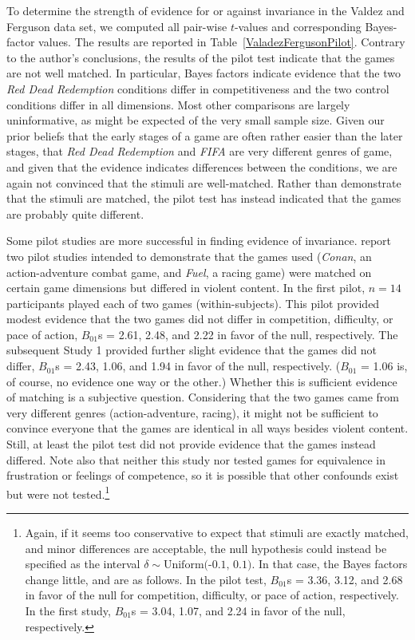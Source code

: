 \documentclass[man]{apa6}
\begin{document}
To determine the strength of evidence for or against invariance in the Valdez and Ferguson data set, we computed all pair-wise $t$-values and corresponding Bayes-factor values.  The results are reported in Table~\ref{ValadezFergusonPilot}. Contrary to the author's conclusions, the results of the pilot test indicate that the games are not well matched. In particular, Bayes factors indicate evidence that the two {\em Red Dead Redemption} conditions differ in competitiveness and the two control conditions differ in all dimensions. Most other comparisons are largely uninformative, as might be expected of the very small sample size. Given our prior beliefs that the early stages of a game are often rather easier than the later stages, that {\em Red Dead Redemption} and {\em FIFA} are very different genres of game, and given that the evidence indicates differences between the conditions, we are again not convinced that the stimuli are well-matched. Rather than demonstrate that the stimuli are matched, the pilot test has instead indicated that the games are probably quite different.

Some pilot studies are more successful in finding evidence of invariance. \citet{Adachi:Willoughby:2011} report two pilot studies intended to demonstrate that the games used ({\em Conan}, an action-adventure combat game, and {\em Fuel}, a racing game) were matched on certain game dimensions but differed in violent content. In the first pilot, $n = 14$ participants played each of two games (within-subjects). This pilot provided modest evidence that the two games did not differ in competition, difficulty, or pace of action, $B_{01}$s = 2.61, 2.48, and 2.22 in favor of the null, respectively. The subsequent Study 1 provided further slight evidence that the games did not differ, $B_{01}$s = 2.43, 1.06, and 1.94 in favor of the null, respectively. ($B_{01}$ = 1.06 is, of course, no evidence one way or the other.) Whether this is sufficient evidence of matching is a subjective question. Considering that the two games came from very different genres (action-adventure, racing), it might not be sufficient to convince everyone that the games are identical in all ways besides violent content. Still, at least the pilot test did not provide evidence that the games instead differed. Note also that neither this study nor \citet{Valadez:Ferguson:2012} tested games for equivalence in frustration or feelings of competence, so it is possible that other confounds exist but were not tested.\footnote{Again, if it seems too conservative to expect that stimuli are exactly matched, and minor differences are acceptable, the null hypothesis could instead be specified as the interval $\delta \sim \mbox{Uniform(-0.1, 0.1)}$. In that case, the Bayes factors change little, and are as follows. In the pilot test, $B_{01}$s = 3.36, 3.12, and 2.68 in favor of the null for competition, difficulty, or pace of action, respectively. In the first study, $B_{01}$s = 3.04, 1.07, and 2.24 in favor of the null, respectively.}
\end{document}
